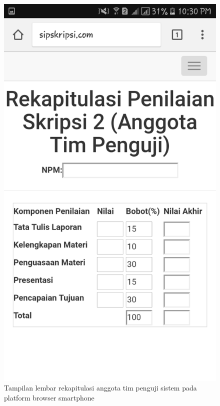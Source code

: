 \begin{figure}[H]
	\centering
	\includegraphics[scale=0.2]{Gambar/hp_anggota}
	\caption{Tampilan lembar rekapitulasi anggota tim penguji sistem pada platform browser smartphone}
	\label{fig:hp_anggota}
\end{figure}

